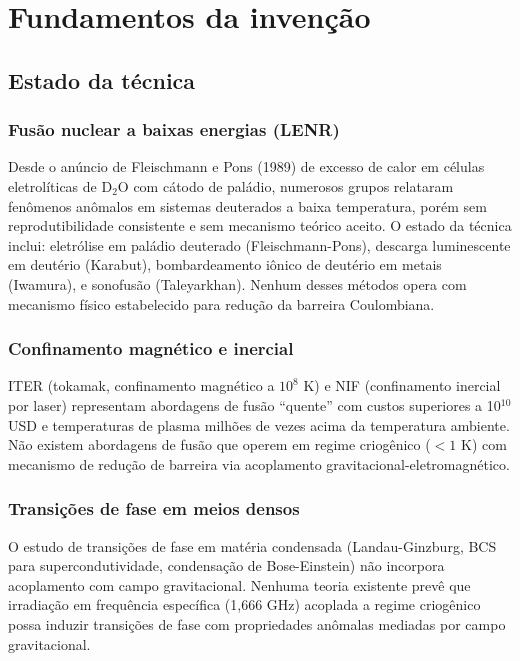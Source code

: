 \documentclass[12pt,a4paper]{article}
\begin{document}
\newpage
\section{Fundamentos da invenção}

\subsection{Estado da técnica}

\subsubsection{Fusão nuclear a baixas energias (LENR)}

Desde o anúncio de Fleischmann e Pons (1989) de excesso de calor
em células eletrolíticas de D$_2$O com cátodo de paládio,
numerosos grupos relataram fenômenos anômalos em sistemas
deuterados a baixa temperatura, porém sem reprodutibilidade
consistente e sem mecanismo teórico aceito. O estado da técnica
inclui: eletrólise em paládio deuterado (Fleischmann-Pons),
descarga luminescente em deutério (Karabut), bombardeamento
iônico de deutério em metais (Iwamura), e sonofusão
(Taleyarkhan). Nenhum desses métodos opera com mecanismo
físico estabelecido para redução da barreira Coulombiana.

\subsubsection{Confinamento magnético e inercial}

ITER (tokamak, confinamento magnético a $10^8$ K) e NIF
(confinamento inercial por laser) representam abordagens de
fusão ``quente'' com custos superiores a 10$^{10}$ USD e
temperaturas de plasma milhões de vezes acima da temperatura
ambiente. Não existem abordagens de fusão que operem em
regime criogênico ($<1$ K) com mecanismo de redução de
barreira via acoplamento gravitacional-eletromagnético.

\subsubsection{Transições de fase em meios densos}

O estudo de transições de fase em matéria condensada
(Landau-Ginzburg, BCS para supercondutividade, condensação de
Bose-Einstein) não incorpora acoplamento com campo gravitacional.
Nenhuma teoria existente prevê que irradiação em frequência
específica (1,666 GHz) acoplada a regime criogênico possa
induzir transições de fase com propriedades anômalas mediadas
por campo gravitacional.
\end{document}
